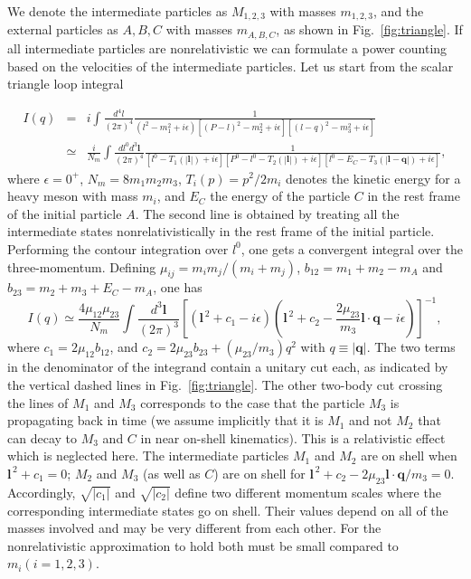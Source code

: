 We denote the intermediate particles as 
$M_{1,2,3}$ with masses $m_{1,2,3}$, and the external particles as $A,B,C$ 
with masses $m_{A,B,C}$, as shown in Fig.~\ref{fig:triangle}.  If 
all intermediate particles are nonrelativistic we can formulate a power 
counting based on the velocities of the intermediate particles. 
%
Let us start from the scalar triangle loop integral
\begin{widetext}
\begin{eqnarray}
    I(q) &=& i\int\!\frac{d^4l}{(2\pi)^4}
\frac{1}{\left(l^2-m_1^2+i\epsilon\right) \left[(P-l)^2-m_2^2+i\epsilon\right]
    \left[(l-q)^2-m_3^2+i\epsilon\right]}
    \nonumber \\
    &\simeq& \frac{i}{N_m} \int\!\frac{dl^0 d^3\bm l}{(2\pi)^4}
\frac1{\left[l^0{-}T_1(|\bm l|)+i\epsilon\right] \left[P^0{-}l^0{-}
T_2(|\bm{l}|)+i\epsilon\right] \left[l^0{-}E_C{-}T_3(|\bm
l{-}\bm{q}|)+i\epsilon\right] },
    \label{eq:scalarI}
\end{eqnarray}
where $\epsilon=0^+$, $N_m=8m_1m_2m_3$, $T_i(p)=p^2/2m_i$ denotes the kinetic 
energy for a 
heavy meson
with mass $m_i$, and $E_C$ the energy of the particle $C$ in the rest frame 
of the initial particle $A$. The second line is obtained by treating all 
the intermediate states 
nonrelativistically in the rest frame of the initial particle. Performing the 
contour integration over $l^0$, one gets a
convergent integral over the three-momentum. Defining
$\mu_{ij}=m_im_j/(m_i+m_j)$, $b_{12} = m_1+m_2-m_A$ and 
$b_{23}=m_2+m_3+E_C-m_A$, one has
\begin{equation}
  I(q) \simeq \frac{4\mu_{12}\mu_{23} }{N_m} \int\! \frac{d^3\bm 
l}{(2\pi)^3}\left[
  \left(\bm{l}^{\,2} + c_1 -i\epsilon\right) \left(\bm{l}^{\,2} + c_2 - 
\frac{2\mu_{23}}{m_3} \bm{l}\cdot\bm{q} - i\epsilon
  \right) \right]^{-1},
  \label{eq:loopinter}
\end{equation}
where $c_1= 2\mu_{12}b_{12}$, and
$c_2=2\mu_{23}b_{23}+\left(\mu_{23}/m_3\right){ q}^2$ with $q\equiv|\bm q|$.
The two terms in the denominator of the integrand
 contain a unitary cut each, as indicated by the
vertical dashed lines in Fig.~\ref{fig:triangle}. The other
two-body cut crossing the lines of $M_1$ and $M_3$ corresponds to the case that
the particle $M_3$ is propagating back in time (we assume implicitly that
it is $M_1$ and not $M_2$ that can decay to $M_3$ and $C$ in near on-shell 
kinematics). This is a relativistic effect which is
neglected here. The intermediate particles $M_1$ 
and $M_2$ are on shell when $\bm l^{\,2} + c_1 = 0$; $M_2$ and $M_3$ (as well 
as $C$) are on shell for $\bm{l}^{\,2} + c_2 - 
{2\mu_{23}} \bm{l}\cdot\bm{q}/m_3 = 0$. Accordingly,
 $\sqrt{|c_1|}$ and $\sqrt{|c_2|}$ define  two
different momentum scales where the corresponding intermediate states go on
shell.
Their values depend on all of the masses involved and may be very different 
from each other. For the nonrelativistic approximation to hold both must be 
small compared
to $m_i (i=1,2,3)$.


\end{widetext}
